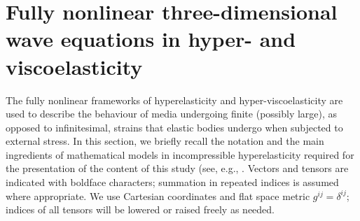 \documentclass[11pt,letter,subeqn,fleqn]{article}
\numberwithin{equation}{section}
\numberwithin{table}{section}
\numberwithin{figure}{section}
\begin{document}
%





\section{Fully nonlinear three-dimensional wave equations in hyper- and viscoelasticity }   \label{Sec:HyperViscoelasticity}

The fully nonlinear frameworks of hyperelasticity and hyper-viscoelasticity are used to describe the behaviour of media undergoing finite (possibly large), as opposed to infinitesimal, strains that elastic bodies undergo when subjected to external stress. In this section, we briefly recall the notation and the main ingredients of mathematical models in incompressible hyperelasticity required for the presentation of the content of this study (see, e.g., \cite{ciarlet1988mathematical, Marsd, Bower, thesisBader}. Vectors and tensors are indicated with boldface characters; summation in repeated indices is assumed where appropriate. We use Cartesian coordinates and flat space metric $g^{ij}=\delta^{ij}$; indices of all tensors will be lowered or raised freely as needed.
\end{document}
